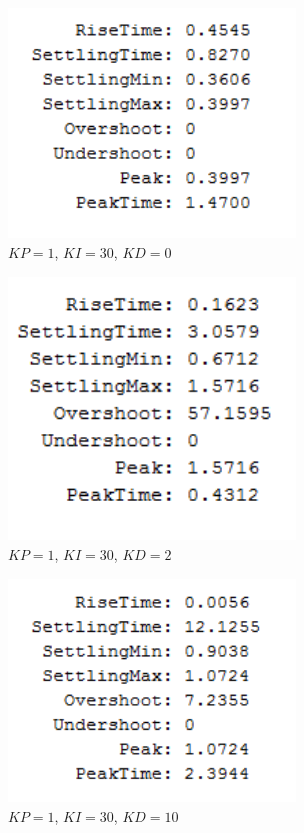 \documentclass[12pt]{article}
\begin{document}
\bigskip

\begin{figure}[h!] %
   \centering
   \includegraphics[width=3in]{4_100.png} 
   \caption{$KP = 1$, $KI = 30$, $KD = 0$}
   \label{fig:example}
\end{figure}

\newpage

\begin{figure}[h!] %
   \centering
   \includegraphics[width=3in]{4_1300.png} 
   \caption{$KP = 1$, $KI = 30$, $KD = 2$}
   \label{fig:example}
\end{figure}

\bigskip

\begin{figure}[h!] %
   \centering
   \includegraphics[width=3in]{4_13010.png} 
   \caption{$KP = 1$, $KI = 30$, $KD = 10$}
   \label{fig:example}
\end{figure}
\end{document}

